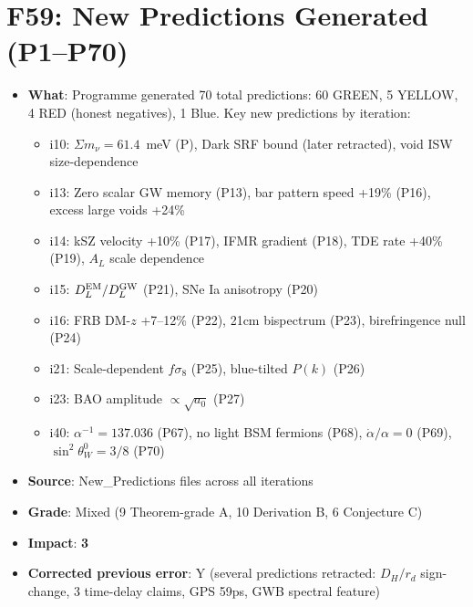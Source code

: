 \documentclass[11pt,a4paper]{article}
\newcommand{\impact}[1]{\textbf{#1}}
\begin{document}
\section{F59: New Predictions Generated (P1--P70)}
\begin{itemize}[nosep]
\item \textbf{What}: Programme generated 70 total predictions: 60 GREEN, 5 YELLOW, 4 RED (honest negatives), 1 Blue. Key new predictions by iteration:
  \begin{itemize}[nosep]
  \item i10: $\Sigma m_\nu = 61.4$~meV (P), Dark SRF bound (later retracted), void ISW size-dependence
  \item i13: Zero scalar GW memory (P13), bar pattern speed +19\% (P16), excess large voids +24\%
  \item i14: kSZ velocity +10\% (P17), IFMR gradient (P18), TDE rate +40\% (P19), $A_L$ scale dependence
  \item i15: $D_L^{\rm EM}/D_L^{\rm GW}$ (P21), SNe Ia anisotropy (P20)
  \item i16: FRB DM-$z$ +7--12\% (P22), 21cm bispectrum (P23), birefringence null (P24)
  \item i21: Scale-dependent $f\sigma_8$ (P25), blue-tilted $P(k)$ (P26)
  \item i23: BAO amplitude $\propto \sqrt{a_0}$ (P27)
  \item i40: $\alpha^{-1} = 137.036$ (P67), no light BSM fermions (P68), $\dot{\alpha}/\alpha = 0$ (P69), $\sin^2\theta_W^0 = 3/8$ (P70)
  \end{itemize}
\item \textbf{Source}: New\_Predictions files across all iterations
\item \textbf{Grade}: Mixed (9 Theorem-grade A, 10 Derivation B, 6 Conjecture C)
\item \textbf{Impact}: \impact{3}
\item \textbf{Corrected previous error}: Y (several predictions retracted: $D_H/r_d$ sign-change, 3 time-delay claims, GPS 59ps, GWB spectral feature)
\end{itemize}

\end{document}
